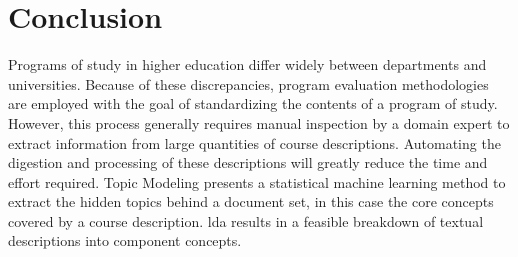 \section{Conclusion}
\label{sec:conclusion}


Programs of study in higher education differ widely between departments and universities.
Because of these discrepancies, program evaluation methodologies are employed with the goal of standardizing the contents of a program of study.
However, this process generally requires manual inspection by a domain expert to extract information from large quantities of course descriptions.
Automating the digestion and processing of these descriptions will greatly reduce the time and effort required.
Topic Modeling presents a statistical machine learning method to extract the hidden topics behind a document set, in this case the core concepts covered by a course description.
\acf{lda} results in a feasible breakdown of textual descriptions into component concepts.




